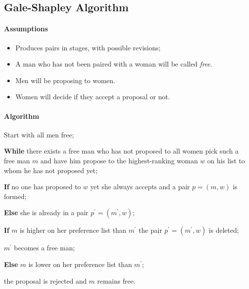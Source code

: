 \subsection{Gale-Shapley Algorithm}
\paragraph{Assumptions}
\begin{itemize}
    \item Produces pairs in stages, with possible revisions;
    \item A man who has not been paired with a woman will be called \textit{free}.
    \item Men will be proposing to women.
    \item Women will decide if they accept a proposal or not.
\end{itemize}

\paragraph{Algorithm}
Start with all men free;

\textbf{While} there exists a free man who has not proposed to all women
pick such a free man $m$ and have him propose to the highest-ranking woman $w$
on his list to whom he has not proposed yet;

\hspace{\parindent} \textbf{If} no one has proposed to $w$ yet 
she always accepts and a pair $p=(m,w)$ is formed;

\hspace{\parindent} \textbf{Else} she is already in a pair $p^\prime=(m^\prime,w);$ 

\hspace{\parindent}\hspace{\parindent} \textbf{If} $m$ is higher on 
her preference list than $m^\prime$ the pair $p^\prime=(m^\prime,w)$ is deleted;

\hspace{\parindent}\hspace{\parindent} $m^\prime$ becomes a free man;

\hspace{\parindent}\hspace{\parindent} \textbf{Else} $m$ is lower on her
preference list than $m^\prime$; 

\hspace{\parindent}\hspace{\parindent} the proposal is rejected and $m$ remains free.

